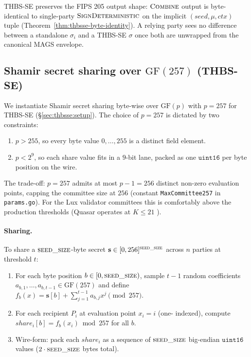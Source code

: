 THBS-SE preserves the FIPS 205 output shape: $\textsc{Combine}$
output is byte-identical to single-party
$\textsc{SignDeterministic}$ on the implicit
$(\mathit{seed}, \mu, \mathit{ctx})$ tuple
(Theorem~\ref{thm:thbsse-byte-identity}). A relying party sees no
difference between a standalone $\sigma_i$ and a THBS-SE $\sigma$
once both are unwrapped from the canonical MAGS envelope.

\subsection{Shamir secret sharing over $\mathrm{GF}(257)$ (THBS-SE)}
\label{sec:prelim:shamir}

We instantiate Shamir secret sharing \cite{shamir1979} byte-wise
over $\mathrm{GF}(p)$ with $p = 257$ for THBS-SE
(\S\ref{sec:thbsse:setup}). The choice of $p = 257$ is
dictated by two constraints:
\begin{enumerate}[leftmargin=2em,nosep]
  \item $p > 255$, so every byte value $0,\ldots,255$ is a distinct
        field element.
  \item $p < 2^9$, so each share value fits in a $9$-bit lane, packed
        as one $\mathtt{uint16}$ per byte position on the wire.
\end{enumerate}
The trade-off: $p = 257$ admits at most $p - 1 = 256$ distinct non-zero
evaluation points, capping the committee size at $256$ (constant
\texttt{MaxCommittee257} in \texttt{params.go}). For the Lux
validator committees this is comfortably above the production
thresholds (Quasar operates at $K \le 21$ \cite{lp020}).

\paragraph{Sharing.} To share a $\textsc{seed\_size}$-byte secret
$\mathbf{s} \in [0,256]^{\textsc{seed\_size}}$ across $n$ parties at
threshold $t$:
\begin{enumerate}[leftmargin=2em,nosep]
  \item For each byte position $b \in [0, \textsc{seed\_size})$, sample
        $t-1$ random coefficients
        $a_{b,1}, \ldots, a_{b,t-1} \in \mathrm{GF}(257)$
        and define
        $f_b(x) = \mathbf{s}[b] + \sum_{j=1}^{t-1} a_{b,j} x^j
          \pmod{257}$.
  \item For each recipient $P_i$ at evaluation point $x_i = i$ (one-
        indexed), compute $\mathit{share}_i[b] = f_b(x_i) \bmod 257$
        for all $b$.
  \item Wire-form: pack each $\mathit{share}_i$ as a sequence of
        $\textsc{seed\_size}$ big-endian $\mathtt{uint16}$ values
        ($2 \cdot \textsc{seed\_size}$ bytes total).
\end{enumerate}

